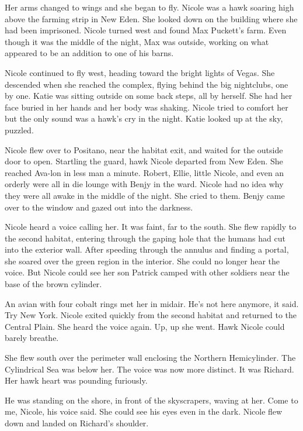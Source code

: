\documentclass[]{article}
\begin{document}
{{Her arms changed to wings and she began to fly.  Nicole was a hawk soaring high above the farming strip in New Eden.  She looked down on the building where she had been imprisoned.  Nicole turned west and found Max Puckett’s farm.  Even though it was the middle of the night, Max was outside, working on what appeared to be an addition to one of his barns.

Nicole continued to fly west, heading toward the bright lights of Vegas.  She descended when she reached the complex, flying behind the big nightclubs, one by one.  Katie was sitting outside on some back steps, all by herself.  She had her face buried in her hands and her body was shaking.  Nicole tried to comfort her but the only sound was a hawk’s cry in the night.  Katie looked up at the sky, puzzled.

Nicole flew over to Positano, near the habitat exit, and waited for the outside door to open.  Startling the guard, hawk Nicole departed from New Eden.  She reached Ava-lon in less man a minute.  Robert, Ellie, little Nicole, and even an orderly were all in die lounge with Benjy in the ward.  Nicole had no idea why they were all awake in the middle of the night.  She cried to them.  Benjy came over to the window and gazed out into the darkness.

Nicole heard a voice calling her.  It was faint, far to the south.  She flew rapidly to the second habitat, entering through the gaping hole that the humans had cut into the exterior wall.  After speeding through the annulus and finding a portal, she soared over the green region in the interior.  She could no longer hear the voice.  But Nicole could see her son Patrick camped with other soldiers near the base of the brown cylinder.

An avian with four cobalt rings met her in midair.  He’s not here anymore, it said.  Try New York.  Nicole exited quickly from the second habitat and returned to the Central Plain.  She heard the voice again.  Up, up she went.  Hawk Nicole could barely breathe.

She flew south over the perimeter wall enclosing the Northern Hemicylinder.  The Cylindrical Sea was below her.  The voice was now more distinct.  It was Richard.  Her hawk heart was pounding furiously.

He was standing on the shore, in front of the skyscrapers, waving at her.  Come to me, Nicole, his voice said.  She could see his eyes even in the dark.  Nicole flew down and landed on Richard’s shoulder.

}}
\end{document}
